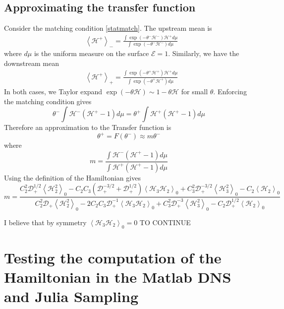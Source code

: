 \documentclass[11pt]{article}
\newcommand{\mean}[1]{\left< #1 \right>}
\newcommand{\drat}{\mathcal{D}}
\newcommand{\dratdn}{\drat_+}
\newcommand{\DD}{\dratdn}
\newcommand{\En}{\mathcal{E}}
\newcommand{\Ham}{\mathcal{H}}
\newcommand{\Hup}{\Ham^{-}}
\newcommand{\Hdn}{\Ham^{+}}
\newcommand{\Hthree}{\Ham_{3}}
\newcommand{\Htwo}{\Ham_{2}}
\newcommand{\thup}{\theta^{-}}
\newcommand{\thdn}{\theta^{+}}
\newcommand{\meanup}[1]{\mean{#1}_{-}}
\newcommand{\meandn}[1]{\mean{#1}_{+}}
\newcommand{\meanz}[1]{\mean{#1}_0}
\begin{document}
\subsection{Approximating the transfer function}
Consider the matching condition \eqref{statmatch}. The upstream mean is
\begin{align}
&\meanup{\Hdn} = \frac{\int \exp\left(-\thup \Hup\right) \Hdn d\mu}{ \int \exp\left(-\thup \Hup \right) d\mu}
\end{align}
where $d \mu$ is the uniform measure on the surface $\En=1$. Similarly, we have the downstream mean
\begin{align}
&\meandn{\Hdn} = \frac{\int \exp\left(-\thdn \Hdn\right) \Hdn d\mu}{ \int \exp\left(-\thdn \Hdn \right) d\mu}
\end{align}
In both cases, we Taylor expand $\exp(-\theta \Ham) \sim 1 - \theta \Ham$ for small $\theta$. Enforcing the matching condition gives
\begin{equation}
\thup \int \Hup (\Hdn -1 ) d\mu = \thdn \int \Hdn (\Hdn - 1) d\mu
\end{equation}
Therefore an approximation to the Transfer function is 
\begin{equation}
\thdn = F(\thup) \approx m \thup
\end{equation}
where
\begin{equation}
m = \frac{  \int \Hup (\Hdn -1 ) d\mu }{ \int \Hdn (\Hdn - 1) d\mu }
\end{equation}
Using the definition of the Hamiltonian gives
\begin{equation}
m = \frac{ C_2^2 \DD^{1/2} \meanz{\Htwo^2} 
	- C_2 C_3(\DD^{-3/2} + \DD^{1/2})  \meanz{\Hthree \Htwo} 
	+ C_3^2 \DD^{-3/2} \meanz{\Hthree^2} - C_2 \meanz{\Htwo}}
	{ C_2^2 \DD \meanz{\Htwo^2} 
	- 2 C_2 C_3 \DD^{-1} \meanz{\Hthree \Htwo} 
	+ C_3^2 \DD^{-3} \meanz{\Hthree^2} - C_2 \DD^{1/2} \meanz{\Htwo}}
\end{equation}

I believe that by symmetry $\meanz{\Hthree \Htwo} = 0$
TO CONTINUE

\section{Testing the computation of the Hamiltonian in the Matlab DNS and Julia Sampling}
\end{document}
